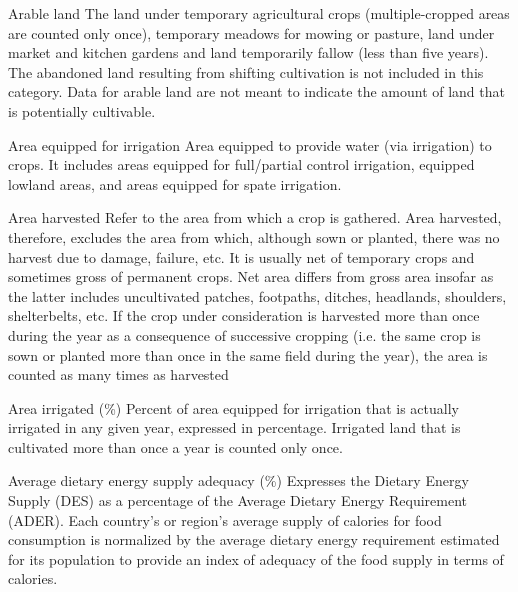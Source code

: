 \begin{MetadataCollection} {}
\begin{metadata}{Arable land} {}
The land under temporary agricultural crops (multiple-cropped areas are counted only once), temporary meadows for mowing or pasture, land under market and kitchen gardens and land temporarily fallow (less than five years). The abandoned land resulting from shifting cultivation is not included in this category. Data for arable land are not meant to indicate the amount of land that is potentially cultivable.
\end{metadata}

\begin{metadata}{Area equipped for irrigation} {}
Area equipped to provide water (via irrigation) to crops. It includes areas equipped for full/partial control irrigation, equipped lowland areas, and areas equipped for spate irrigation.
\end{metadata}

\begin{metadata}{Area harvested} {}
Refer to the area from which a crop is gathered. Area harvested, therefore, excludes the area from which, although sown or planted, there was no harvest due to damage, failure, etc. It is usually net of temporary crops and sometimes gross of permanent crops. Net area differs from gross area insofar as the latter includes uncultivated patches, footpaths, ditches, headlands, shoulders, shelterbelts, etc. If the crop under consideration is harvested more than once during the year as a consequence of successive cropping (i.e. the same crop is sown or planted more than once in the same field during the year), the area is counted as many times as harvested
\end{metadata}

\begin{metadata}{Area irrigated (\%)} {}
Percent of area equipped for irrigation that is actually irrigated in any given year, expressed in percentage. Irrigated land that is cultivated more than once a year is counted only once.
\end{metadata}

\begin{metadata}{Average dietary energy supply adequacy (\%)} {}
Expresses the Dietary Energy Supply (DES) as a percentage of the Average Dietary Energy Requirement (ADER). Each country's or region's average supply of calories for food consumption is normalized by the average dietary energy requirement estimated for its population to provide an index of adequacy of the food supply in terms of calories.
\end{metadata}


\end{MetadataCollection}
